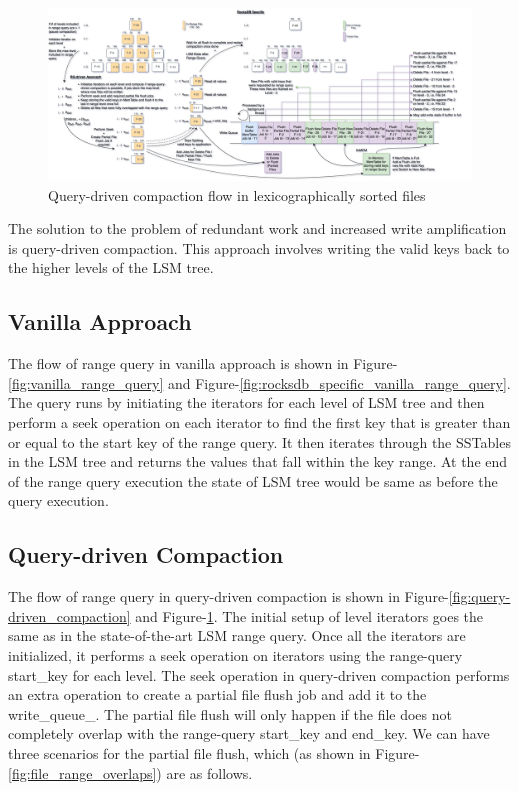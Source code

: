 \begin{figure}
    \includegraphics[scale=0.10]{Figures/RQ-driven rocksdb specific.png}
    \caption{Query-driven compaction flow in lexicographically sorted files}\label{fig:rocksdb_specific_query-driven_compaction}
\end{figure}

The solution to the problem of redundant work and increased write amplification is query-driven compaction. This 
approach involves writing the valid keys back to the higher levels of the LSM tree.

\subsection{Vanilla Approach}
The flow of range query in vanilla approach is shown in Figure-\ref{fig:vanilla_range_query} and 
Figure-\ref{fig:rocksdb_specific_vanilla_range_query}. The query runs by 
initiating the iterators for each level of LSM tree and then perform a seek operation on each iterator to find the 
first key that is greater than or equal to the start key of the range query. It then iterates through the
SSTables in the LSM tree and returns the values that fall within the key range. At the end of the range query
execution the state of LSM tree would be same as before the query execution.

\subsection{Query-driven Compaction}
The flow of range query in query-driven compaction is shown in Figure-\ref{fig:query-driven_compaction} and 
Figure-\ref{fig:rocksdb_specific_query-driven_compaction}. The initial 
setup of level iterators goes the same as in the state-of-the-art LSM range query. Once all the iterators are 
initialized, it performs a seek operation on iterators using the range-query start\_key for each level. The seek 
operation in query-driven compaction performs an extra operation to create a partial file flush job and add it to the 
write\_queue\_. The partial file flush will only happen if the file does not completely overlap with the range-query 
start\_key and end\_key. We can have three scenarios for the partial file flush, which 
(as shown in Figure-\ref{fig:file_range_overlaps}) are as follows.

